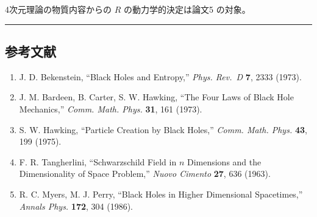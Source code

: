 \documentclass[a4paper,11pt]{ltjsarticle}
\theoremstyle{definition}
\providecommand{\tightlist}{\setlength{\itemsep}{0pt}\setlength{\parskip}{0pt}}
\begin{document}
4次元理論の物質内容からの \(R\) の動力学的決定は論文5 の対象。

\begin{center}\rule{0.5\linewidth}{0.5pt}\end{center}

\subsection{参考文献}\label{ux53c2ux8003ux6587ux732e}

\begin{enumerate}
\def\labelenumi{\arabic{enumi}.}
\tightlist
\item
  J. D. Bekenstein, ``Black Holes and Entropy,'' \emph{Phys. Rev.~D}
  \textbf{7}, 2333 (1973).
\item
  J. M. Bardeen, B. Carter, S. W. Hawking, ``The Four Laws of Black Hole
  Mechanics,'' \emph{Comm. Math. Phys.} \textbf{31}, 161 (1973).
\item
  S. W. Hawking, ``Particle Creation by Black Holes,'' \emph{Comm. Math.
  Phys.} \textbf{43}, 199 (1975).
\item
  F. R. Tangherlini, ``Schwarzschild Field in \(n\) Dimensions and the
  Dimensionality of Space Problem,'' \emph{Nuovo Cimento} \textbf{27},
  636 (1963).
\item
  R. C. Myers, M. J. Perry, ``Black Holes in Higher Dimensional
  Spacetimes,'' \emph{Annals Phys.} \textbf{172}, 304 (1986).
\end{enumerate}
\end{document}
